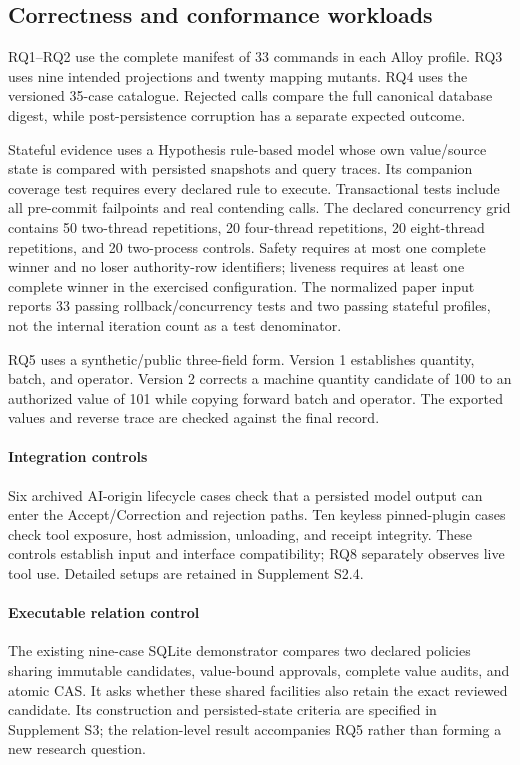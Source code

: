 \subsection{Correctness and conformance workloads}

RQ1--RQ2 use the complete manifest of 33 commands in each Alloy profile. RQ3 uses nine intended projections and twenty mapping mutants. RQ4 uses the versioned 35-case catalogue. Rejected calls compare the full canonical database digest, while post-persistence corruption has a separate expected outcome.

Stateful evidence uses a Hypothesis rule-based model whose own value/source state is compared with persisted snapshots and query traces. Its companion coverage test requires every declared rule to execute. Transactional tests include all pre-commit failpoints and real contending calls. The declared concurrency grid contains 50 two-thread repetitions, 20 four-thread repetitions, 20 eight-thread repetitions, and 20 two-process controls. Safety requires at most one complete winner and no loser authority-row identifiers; liveness requires at least one complete winner in the exercised configuration. The normalized paper input reports 33 passing rollback/concurrency tests and two passing stateful profiles, not the internal iteration count as a test denominator.

RQ5 uses a synthetic/public three-field form. Version 1 establishes quantity, batch, and operator. Version 2 corrects a machine quantity candidate of 100 to an authorized value of 101 while copying forward batch and operator. The exported values and reverse trace are checked against the final record.

\paragraph{Integration controls}
Six archived AI-origin lifecycle cases check that a persisted model output can enter the Accept/Correction and rejection paths. Ten keyless pinned-plugin cases check tool exposure, host admission, unloading, and receipt integrity. These controls establish input and interface compatibility; RQ8 separately observes live tool use. Detailed setups are retained in Supplement S2.4.

\paragraph{Executable relation control}
The existing nine-case SQLite demonstrator compares two declared policies sharing immutable candidates, value-bound approvals, complete value audits, and atomic CAS. It asks whether these shared facilities also retain the exact reviewed candidate. Its construction and persisted-state criteria are specified in Supplement S3; the relation-level result accompanies RQ5 rather than forming a new research question.

